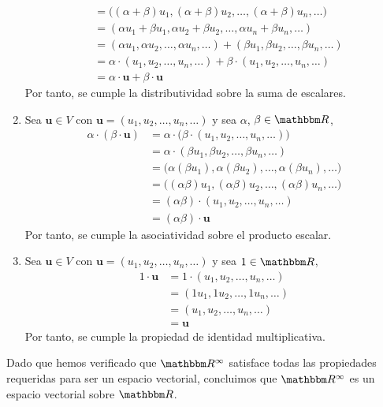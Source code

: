 \begin{examplebox}{}{}
\begin{enumerate}[label=\roman*), topsep=6pt, itemsep=0pt]
\begin{align*}
            & = \big( (\alpha + \beta)u_1, (\alpha + \beta)u_2, \dots, (\alpha + \beta)u_n, \dots \big) \\
            & = (\alpha u_1 + \beta u_1, \alpha u_2 + \beta u_2, \dots, \alpha u_n + \beta u_n, \dots) \\
            & = (\alpha u_1, \alpha u_2, \dots, \alpha u_n, \dots) + (\beta u_1, \beta u_2, \dots, \beta u_n, \dots) \\
            & = \alpha \cdot (u_1, u_2, \dots, u_n, \dots) + \beta \cdot (u_1, u_2, \dots, u_n, \dots) \\
            & = \alpha \cdot \mathbf{u} + \beta \cdot \mathbf{u}
        \end{align*}
        Por tanto, se cumple la distributividad sobre la suma de escalares.
        \item Sea $\mathbf{u} \in V$ con $\mathbf{u} = (u_1, u_2, \dots, u_n, \dots)$ y sea $\alpha$, $\beta \in \RR$,
        \begin{align*}
            \alpha \cdot (\beta \cdot \mathbf{u}) & = \alpha \cdot \big(\beta \cdot (u_1, u_2, \dots, u_n, \dots) \big) \\
            & = \alpha \cdot (\beta u_1, \beta u_2, \dots, \beta u_n, \dots) \\
            & = \big( \alpha (\beta u_1), \alpha (\beta u_2), \dots, \alpha (\beta u_n), \dots \big) \\
            & = \big( (\alpha\beta) u_1, (\alpha\beta) u_2, \dots, (\alpha\beta) u_n, \dots \big) \\
            & = (\alpha\beta) \cdot (u_1, u_2, \dots, u_n, \dots) \\
            & = (\alpha\beta) \cdot \mathbf{u}
        \end{align*}
        Por tanto, se cumple la asociatividad sobre el producto escalar.
        \item Sea $\mathbf{u} \in V$ con $\mathbf{u} = (u_1, u_2, \dots, u_n, \dots)$ y sea $1 \in \RR$,
        \begin{align*}
            1 \cdot \mathbf{u} & = 1 \cdot (u_1, u_2, \dots, u_n, \dots) \\
            & = (1 u_1, 1 u_2, \dots, 1 u_n, \dots) \\
            & = (u_1, u_2, \dots, u_n, \dots) \\
            & = \mathbf{u}
        \end{align*}
        Por tanto, se cumple la propiedad de identidad multiplicativa.
    \end{enumerate}
    Dado que hemos verificado que $\RR[\infty]$ satisface todas las propiedades requeridas para ser un espacio vectorial, concluimos que $\RR[\infty]$ es un espacio vectorial sobre $\RR$.
\end{examplebox}

